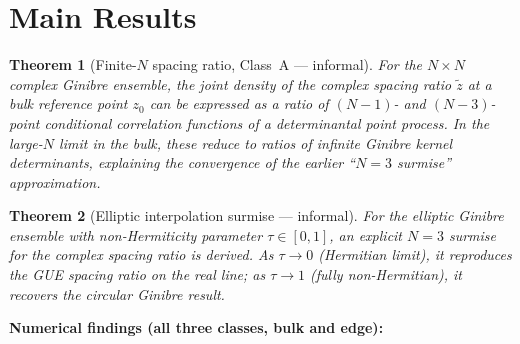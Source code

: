 \documentclass[11pt,a4paper]{article}
\newtheorem{theorem}{Theorem}
\theoremstyle{definition}
\begin{document}
\section{Main Results}

\begin{theorem}[Finite-$N$ spacing ratio, Class~A --- informal]
For the $N\times N$ complex Ginibre ensemble, the joint density of the complex spacing ratio $\tilde{z}$ at a bulk reference point $z_0$ can be expressed as a ratio of $(N-1)$- and $(N-3)$-point conditional correlation functions of a determinantal point process.
In the large-$N$ limit in the bulk, these reduce to ratios of infinite Ginibre kernel determinants, explaining the convergence of the earlier ``$N=3$ surmise'' approximation.
\end{theorem}

\begin{theorem}[Elliptic interpolation surmise --- informal]
For the elliptic Ginibre ensemble with non-Hermiticity parameter $\tau\in[0,1]$, an explicit $N=3$ surmise for the complex spacing ratio is derived.
As $\tau\to 0$ (Hermitian limit), it reproduces the GUE spacing ratio on the real line; as $\tau\to 1$ (fully non-Hermitian), it recovers the circular Ginibre result.
\end{theorem}

\textbf{Numerical findings (all three classes, bulk and edge):}
\end{document}
